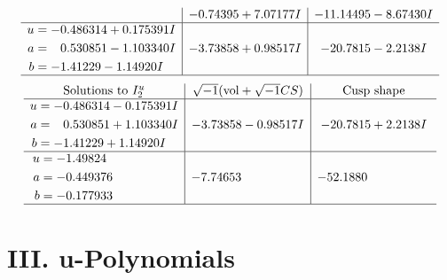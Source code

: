 \documentclass[1p]{elsarticle_modified}
\theoremstyle{definition}
\newcommand{\I}{\sqrt{-1}}
\begin{document}
$$\begin{array}{c|c|c}
 & -0.74395 + 7.07177 I & -11.14495 - 8.67430 I \\ \hline\begin{aligned}
u &= -0.486314 + 0.175391 I \\
a &= \phantom{-}0.530851 - 1.103340 I \\
b &= -1.41229 - 1.14920 I\end{aligned}
 & -3.73858 + 0.98517 I & -20.7815 - 2.2138 I\\
 \hline 
 \end{array}$$\newpage$$\begin{array}{c|c|c}  
\text{Solutions to }I^u_{2}& \I (\text{vol} + \sqrt{-1}CS) & \text{Cusp shape}\\
 \hline 
\begin{aligned}
u &= -0.486314 - 0.175391 I \\
a &= \phantom{-}0.530851 + 1.103340 I \\
b &= -1.41229 + 1.14920 I\end{aligned}
 & -3.73858 - 0.98517 I & -20.7815 + 2.2138 I \\ \hline\begin{aligned}
u &= -1.49824\phantom{ +0.000000I} \\
a &= -0.449376\phantom{ +0.000000I} \\
b &= -0.177933\phantom{ +0.000000I}\end{aligned}
 & -7.74653\phantom{ +0.000000I} & -52.1880\phantom{ +0.000000I}\\
 \hline 
 \end{array}$$\newpage
\newpage\renewcommand{\arraystretch}{1}
\centering \section*{ III. u-Polynomials}
\end{document}
